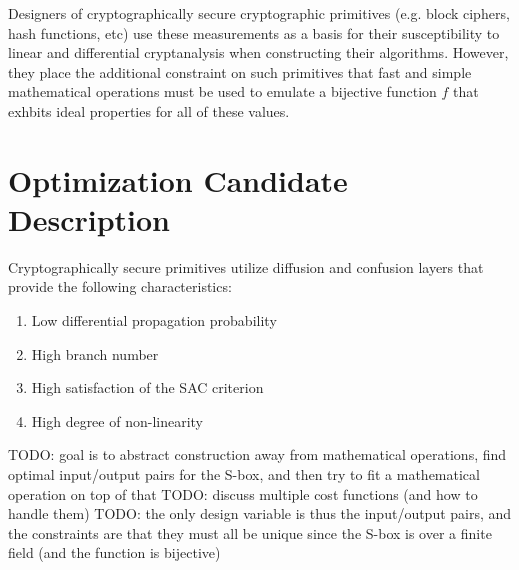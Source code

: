 \documentclass[11pt]{article}
\begin{document}
Designers of cryptographically secure cryptographic primitives (e.g. block ciphers, hash functions, etc) use these measurements as a basis for their susceptibility to linear and differential cryptanalysis when constructing their algorithms. However, they place the additional constraint on such primitives that fast and simple mathematical operations must be used to emulate a bijective function $f$ that exhbits ideal properties for all of these values.


\section{Optimization Candidate Description}
Cryptographically secure primitives utilize diffusion and confusion layers that provide the following characteristics:

\begin{enumerate}
	\item Low differential propagation probability
	\item High branch number
	\item High satisfaction of the SAC criterion
	\item High degree of non-linearity
\end{enumerate}

TODO: goal is to abstract construction away from mathematical operations, find optimal input/output pairs for the S-box, and then try to fit a mathematical operation on top of that
TODO: discuss multiple cost functions (and how to handle them)
TODO: the only design variable is thus the input/output pairs, and the constraints are that they must all be unique since the S-box is over a finite field (and the function is bijective)
\end{document}
